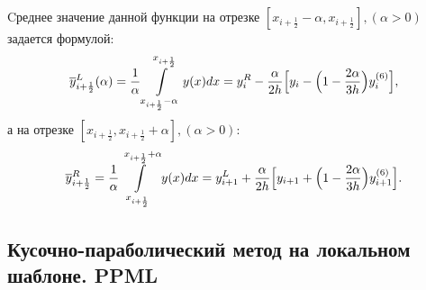 \documentclass[12pt,a4paper]{article}
\newcommand{\half}{\frac{1}{2}}
\begin{document}
    Cреднее значение данной функции на отрезке $ [x_{i+\half}-\alpha, x_{i+\half}], (\alpha > 0) $ задается формулой:
    \begin{equation}
        \label{average_positive}
        \overline y_{i+\half}^L(\alpha) = \dfrac{1}{\alpha} \displaystyle \int\limits_{x_{i+\half}-\alpha}^{x_{i+\half}} y(x) dx = y_i^R - \dfrac{\alpha}{2h}\Bigl[ \Delta y_i - \Bigl( 1 - \dfrac{2 \alpha}{3h} \Bigr)y_i^{(6)} \Bigr],
    \end{equation}
    \noindent а на отрезке $ [x_{i+\half}, x_{i+\half}+\alpha], (\alpha > 0)$:
    \begin{equation}
        \label{average_negative}
        \overline y_{i+\half}^R = \dfrac{1}{\alpha} \displaystyle \int\limits_{x_{i+\half}}^{x_{i+\half}+\alpha} y(x) dx = y_{i+1}^L  + \dfrac{\alpha}{2h} \Bigl[\Delta y_{i+1} + \Bigl( 1 - \dfrac{2\alpha}{3h} \Bigr) y_{i+1}^{(6)} \Bigr].
    \end{equation}

    \subsection{Кусочно-параболический метод на локальном шаблоне. PPML}
\end{document}
